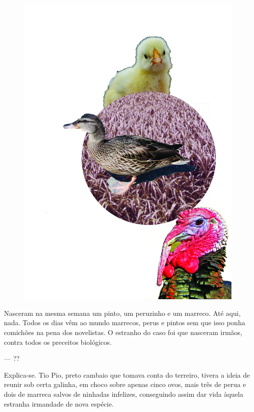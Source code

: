 \pagebreak
\thispagestyle{empty}
\begin{figure}
\vspace*{-.5cm}
\hspace*{-2.3cm}\includegraphics[width=140mm]{../ilustracoes/16_TRAGEDIA.jpg}
\end{figure}
\pagebreak


\noindent{}Nasceram na mesma semana um pinto, um peruzinho e um marreco. Até aqui,
nada. Todos os dias vêm ao mundo marrecos, perus e pintos sem que isso
ponha comichões na pena dos novelistas. O estranho do caso foi que
nasceram irmãos, contra todos os preceitos biológicos.

--- ??

Explica-se. Tio Pio, preto cambaio que tomava conta do terreiro, tivera
a ideia de reunir sob certa galinha, em choco sobre apenas cinco ovos,
mais três de perua e dois de marreca salvos de ninhadas infelizes,
conseguindo assim dar vida àquela estranha irmandade de nova espécie.

